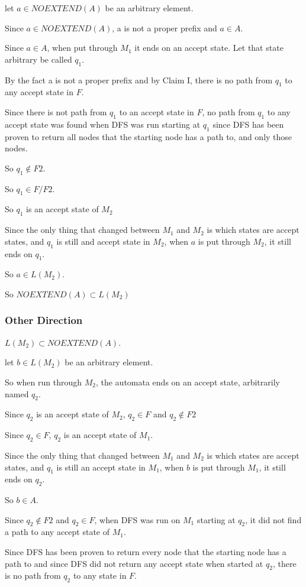 \documentclass[letterpaper, 11pt]{article}
\begin{document}
let $a \in NOEXTEND(A)$ be an arbitrary element.

Since $a \in NOEXTEND(A)$, a is not a proper prefix and $a \in A$.

Since $a \in A$, when put through $M_1$ it ends on an accept state.
Let that state arbitrary be called $q_1$.

By the fact a is not a proper prefix and by Claim I, there is no path from $q_1$ to any accept state in $F$.

Since there is not path from $q_1$ to an accept state in $F$, no path from $q_1$ to any accept state was found when DFS was run starting at $q_1$ since DFS has been proven to return all nodes that the starting node has a path to, and only those nodes.

So $q_1 \notin F2$.

So $q_1 \in F/F2$.

So $q_1$ is an accept state of $M_2$

Since the only thing that changed between $M_1$ and $M_2$ is which states are accept states, and $q_1$ is still and accept state in $M_2$, when $a$ is put through $M_2$, it still ends on $q_1$.

So $a \in L(M_2)$.

So $NOEXTEND(A) \subset L(M_2)$
\subsubsection*{Other Direction}
$L(M_2) \subset NOEXTEND(A)$.

let $b \in L(M_2)$ be an arbitrary element.

So when run through $M_2$, the automata ends on an accept state, arbitrarily named $q_2$.

Since $q_2$ is an accept state of $M_2$, $q_2 \in F$ and $q_2 \notin F2$

Since $q_2 \in F$, $q_2$ is an accept state of $M_1$.

Since the only thing that changed between $M_1$ and $M_2$ is which states are accept states, and $q_1$ is still an accept state in $M_1$, when $b$ is put through $M_1$, it still ends on $q_2$.

So $b \in A$.

Since $q_2 \notin F2$ and $q_2 \in F$, when DFS was run on $M_1$ starting at $q_2$, it did not find a path to any accept state of $M_1$.

Since DFS has been proven to return every node that the starting node has a path to and since DFS did not return any accept state when started at $q_2$, there is no path from $q_2$ to any state in $F$.
\end{document}
